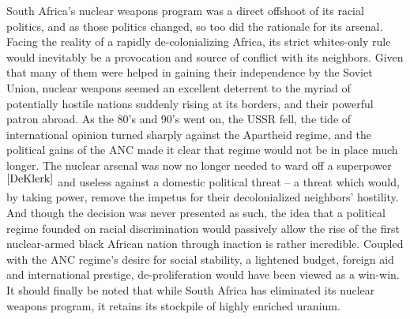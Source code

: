 \documentclass[journal]{IEEEtran}
\begin{document}
South Africa's nuclear weapons program was a direct offshoot of its racial politics, and as those politics changed, so too did the rationale for its arsenal.  Facing the reality of a rapidly de-colonializing Africa, its strict whites-only rule would inevitably be a provocation and source of conflict with its neighbors.  Given that many of them were helped in gaining their independence by the Soviet Union, nuclear weapons seemed an excellent deterrent to the myriad of potentially hostile nations suddenly rising at its borders, and their powerful patron abroad.  As the 80's and 90's went on, the USSR fell, the tide of international opinion turned sharply against the Apartheid regime, and the political gains of the ANC made it clear that regime would not be in place much longer.  The nuclear arsenal was now no longer needed to ward off a superpower$^{\cite{DeKlerk}}$ and useless against a domestic political threat – a threat which would, by taking power, remove the impetus for their decolonialized neighbors' hostility.  And though the decision was never presented as such, the idea that a political regime founded on racial discrimination would passively allow the rise of the first nuclear-armed black African nation through inaction is rather incredible.  Coupled with the ANC regime's desire for social stability, a lightened budget, foreign aid and international prestige, de-proliferation would have been viewed as a win-win.  It should finally be noted that while South Africa has eliminated its nuclear weapons program, it retains its stockpile of highly enriched uranium.
\end{document}
